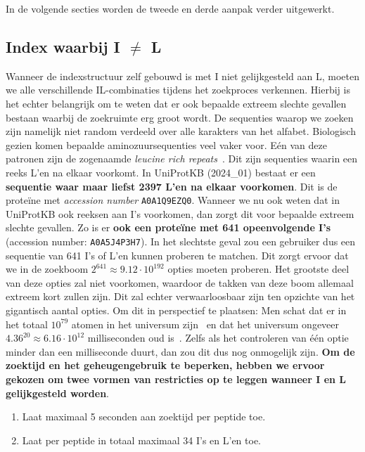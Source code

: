 In de volgende secties worden de tweede en derde aanpak verder uitgewerkt.

\subsection{Index waarbij I $\neq$ L}\label{subsec:index-waarbij-i-neq-l}
Wanneer de indexstructuur zelf gebouwd is met I niet gelijkgesteld aan L, moeten we alle verschillende IL-combinaties tijdens het zoekproces verkennen.
Hierbij is het echter belangrijk om te weten dat er ook bepaalde extreem slechte gevallen bestaan waarbij de zoekruimte erg groot wordt.
De sequenties waarop we zoeken zijn namelijk niet random verdeeld over alle karakters van het alfabet.
Biologisch gezien komen bepaalde aminozuursequenties veel vaker voor.
Eén van deze patronen zijn de zogenaamde \textit{leucine rich repeats}~\cite{leucine_rich_repeats}.
Dit zijn sequenties waarin een reeks L'en na elkaar voorkomt.
In UniProtKB (2024\_01) bestaat er een \textbf{sequentie waar maar liefst 2397 L'en na elkaar voorkomen}.
Dit is de proteïne met \textit{accession number} \texttt{A0A1Q9EZQ0}.
Wanneer we nu ook weten dat in UniProtKB ook reeksen aan I's voorkomen, dan zorgt dit voor bepaalde extreem slechte gevallen.
Zo is er \textbf{ook een proteïne met 641 opeenvolgende I's} (accession number: \texttt{A0A5J4P3H7}).
In het slechtste geval zou een gebruiker dus een sequentie van 641 I's of L'en kunnen proberen te matchen.
Dit zorgt ervoor dat we in de zoekboom $2^{641} \approx 9.12 \cdot 10^{192}$ opties moeten proberen.
Het grootste deel van deze opties zal niet voorkomen, waardoor de takken van deze boom allemaal extreem kort zullen zijn.
Dit zal echter verwaarloosbaar zijn ten opzichte van het gigantisch aantal opties.
Om dit in perspectief te plaatsen: Men schat dat er in het totaal $10^{79}$ atomen in het universum zijn~\cite{atoms_in_universe} en dat het universum ongeveer $4.36^{20} \approx 6.16 \cdot 10^{12}$ milliseconden oud is~\cite{age_universe}.
Zelfs als het controleren van één optie minder dan een milliseconde duurt, dan zou dit dus nog onmogelijk zijn.
\textbf{Om de zoektijd en het geheugengebruik te beperken, hebben we ervoor gekozen om twee vormen van restricties op te leggen wanneer I en L gelijkgesteld worden}.
\begin{enumerate}
    \item Laat maximaal 5 seconden aan zoektijd per peptide toe.
    \item Laat per peptide in totaal maximaal 34 I's en L'en toe.
\end{enumerate}
